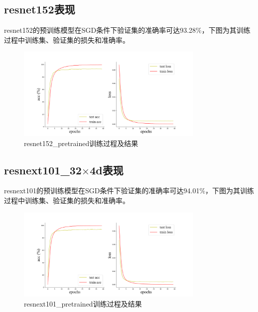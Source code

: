 \documentclass[10.5pt,a4paper]{article}%
\begin{document}
        \subsection{resnet152表现}
        resnet152的预训练模型在SGD条件下验证集的准确率可达93.28\%，下图为其训练过程中训练集、验证集的损失和准确率。
        \begin{figure}[H]
            \centering
                \includegraphics[width=0.8\textwidth]{resnet152_pretrained.png}
              \caption{resnet152\_pretrained训练过程及结果}
              \label{fig:resnet152_best_result}
        \end{figure}
        \subsection{resnext101\_32$\times$4d表现}
        resnext101的预训练模型在SGD条件下验证集的准确率可达94.01\%，下图为其训练过程中训练集、验证集的损失和准确率。
        \begin{figure}[H]
            \centering
                \includegraphics[width=0.8\textwidth]{resnext101_pretrained.png}
              \caption{resnext101\_pretrained训练过程及结果}
              \label{fig:resnext101_best_result}
        \end{figure}
\end{document}
